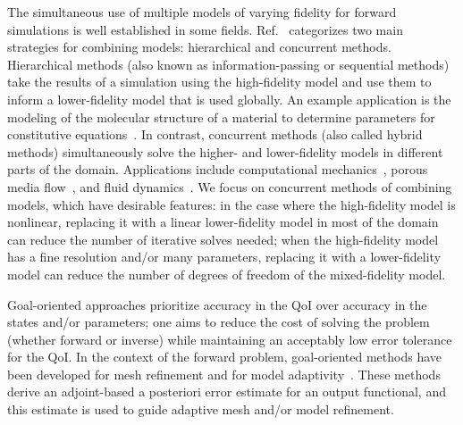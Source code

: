 The simultaneous use of multiple models of varying fidelity for forward simulations is well established in some fields. Ref.~\cite{Liuetal03} categorizes two main strategies for combining models: hierarchical and concurrent methods. Hierarchical methods (also known as information-passing or sequential methods) take the results of a simulation using the high-fidelity model and use them to inform a lower-fidelity model that is used globally. An example application is the modeling of the molecular structure of a material to determine parameters for constitutive equations~\cite{Haoetal03,Weietal04}. In contrast, concurrent methods (also called hybrid methods) simultaneously solve the higher- and lower-fidelity models in different parts of the domain. Applications include computational mechanics~\cite{Khareetal08,Prudetal08}, porous media flow~\cite{tartakovsky2008hybrid,battiato2011hybrid}, and fluid dynamics~\cite{AlexGarTar02,FatGerQua01,Garcetal99,LucKinBer02,vanOpstaletal15,WadErw90}. We focus on concurrent methods of combining models, which have desirable features: in the case where the high-fidelity model is nonlinear, replacing it with a linear lower-fidelity model in most of the domain can reduce the number of iterative solves needed; when the high-fidelity model has a fine resolution and/or many parameters, replacing it with a lower-fidelity model can reduce the number of degrees of freedom of the mixed-fidelity model.

Goal-oriented approaches prioritize accuracy in the QoI over accuracy in the states and/or parameters; one aims to reduce the cost of solving the problem (whether forward or inverse) while maintaining an acceptably low error tolerance for the QoI. In the context of the forward problem, goal-oriented methods have been developed for mesh refinement \cite{BecRann01,Park04,PrudOden99,VendDarm00,Yano12} and for model adaptivity~\cite{BraackErn03,OdenPrudetal06}. These methods derive an adjoint-based a posteriori error estimate for an output functional, and this estimate is used to guide adaptive mesh and/or model refinement.

